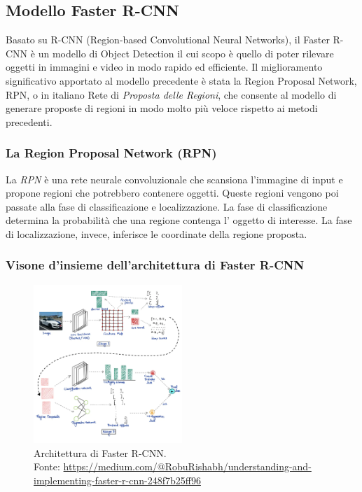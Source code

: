\subsection{Modello Faster R-CNN}
Basato su R-CNN (Region-based Convolutional Neural Networks), il Faster R-CNN è un modello di Object
Detection il cui scopo è quello di poter rilevare oggetti in immagini e video in modo rapido ed efficiente.
Il miglioramento significativo apportato al modello precedente è stata la Region Proposal Network, RPN,
o in italiano Rete di \textit{Proposta delle Regioni}, che consente al modello di generare proposte di regioni in modo molto più veloce
rispetto ai metodi precedenti.\\


\subsubsection{La Region Proposal Network (RPN)}
La \textit{RPN} è una rete neurale convoluzionale che scansiona l'immagine di input e propone
regioni che potrebbero contenere oggetti. Queste regioni vengono poi passate alla fase di classificazione
e localizzazione. La fase di classificazione determina la probabilità che una regione contenga
l' oggetto di interesse. La fase di localizzazione, invece, inferisce le coordinate della regione proposta.


\subsubsection{Visone d'insieme dell'architettura di Faster R-CNN}


\begin{figure}[H]
   \centering
   \includegraphics[width=0.5\textwidth]{images/faster_rcnn_architecture.png}
       \caption{Architettura di Faster R-CNN.\\
       Fonte: \url{https://medium.com/@RobuRishabh/understanding-and-implementing-faster-r-cnn-248f7b25ff96}}
   \label{fig:faster-rcnn-architecture}
\end{figure}


